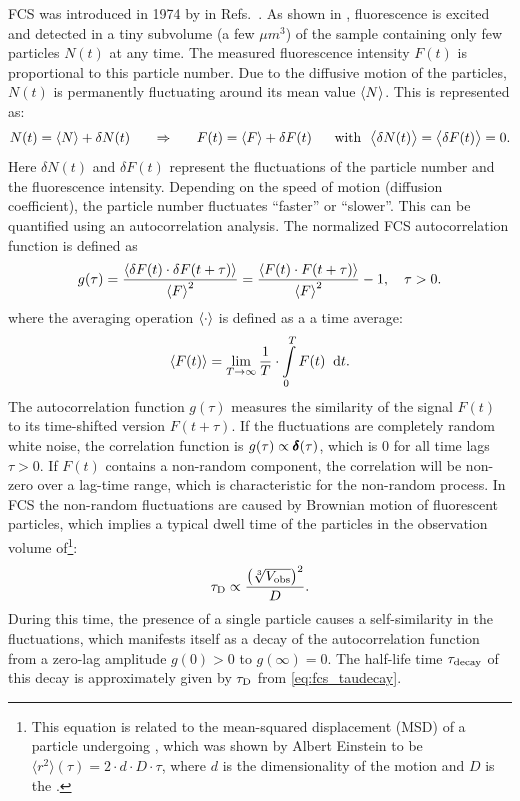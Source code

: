 FCS was introduced  in 1974 by \citeauthor*{MAGDE1974} in Refs.~\cite{MAGDE1974, MAGDE1974a,MAGDE1978}. As shown in , fluorescence is excited and detected in a tiny subvolume (a few $\unit{\mu m^3}$) of the sample containing only few particles $N(t)$ at any time. The measured fluorescence intensity $F(t)$ is proportional to this particle number. Due to the diffusive motion of the particles, $N(t)$ is permanently fluctuating around its mean value $\left\langle N\right\rangle$. This is represented as:
\begin{equation}\label{eq:fcs_particlenumber}
  N(t)=\mean{N}+\delta N(t)\ \ \ \ \ \Rightarrow\ \ \ \ \ F(t)=\mean{F}+\delta F(t)\ \ \ \ \ \text{with}\ \ \smean{\delta N(t)}=\smean{\delta F(t)}=0.
\end{equation}
Here $\delta N(t)$ and $\delta F(t)$ represent the fluctuations of the particle number and the fluorescence intensity. Depending on the speed of motion (diffusion coefficient), the particle number fluctuates ``faster'' or ``slower''. This can be quantified using an autocorrelation analysis. The normalized FCS autocorrelation function is defined as
\begin{equation}\label{eq:fcs_acf}
  g(\tau)=\frac{\left\langle \delta F(t)\cdot\delta F(t+\tau)\right\rangle}{\left\langle F\right\rangle^2}=\frac{\left\langle  F(t)\cdot F(t+\tau)\right\rangle}{\left\langle F\right\rangle^2}-1,\ \ \ \tau>0.
\end{equation}
where the averaging operation $\left\langle \cdot\right\rangle$ is defined as a a time average:
\begin{equation}\label{eq:fcs_avg}
  \left\langle F(t)\right\rangle=\lim\limits_{T\rightarrow\infty}\frac{1}{T}\cdot\int\limits_0^TF(t)\;\;\mathrm{d}t.
\end{equation}
The autocorrelation function $g(\tau)$ measures the similarity of the signal $F(t)$ to its time-shifted version $F(t+\tau)$. If the fluctuations are completely random white noise, the correlation function is $g(\tau)\propto\pmb{\delta}(\tau)$, which is $0$ for all time lags $\tau>0$. If $F(t)$ contains a non-random component, the correlation will be non-zero over a lag-time range, which is characteristic for the non-random process. In FCS the non-random fluctuations are caused by Brownian motion of fluorescent particles, which implies a typical dwell time of the particles in the observation volume of\footnote{This equation is related to the mean-squared displacement (MSD) of a particle undergoing , which was shown by Albert Einstein to be $\langle r^2\rangle(\tau)=2\cdot d\cdot D\cdot\tau$, where $d$ is the dimensionality of the motion and $D$ is the .}:
\begin{equation}\label{eq:fcs_taudecay}
  \tau_{\text{D}}\propto\frac{\left(\sqrt[3]{V_{\text{obs}}}\right)^2}{D}.
\end{equation}
During this time, the presence of a single particle causes a self-similarity in the fluctuations, which manifests itself as a decay of the autocorrelation function from a zero-lag amplitude $g(0)>0$ to $g(\infty)=0$. The half-life time $\tau_{\text{decay}}$ of this decay is approximately given by $\tau_{\text{D}}$ from \eqref{eq:fcs_taudecay}.

